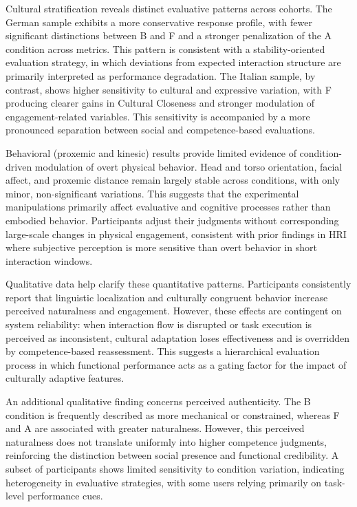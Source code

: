 Cultural stratification reveals distinct evaluative patterns across cohorts. The German sample exhibits a more conservative response profile, with fewer significant distinctions between B and F and a stronger penalization of the A condition across metrics. This pattern is consistent with a stability-oriented evaluation strategy, in which deviations from expected interaction structure are primarily interpreted as performance degradation. The Italian sample, by contrast, shows higher sensitivity to cultural and expressive variation, with F producing clearer gains in Cultural Closeness and stronger modulation of engagement-related variables. This sensitivity is accompanied by a more pronounced separation between social and competence-based evaluations.

Behavioral (proxemic and kinesic) results provide limited evidence of condition-driven modulation of overt physical behavior. Head and torso orientation, facial affect, and proxemic distance remain largely stable across conditions, with only minor, non-significant variations. This suggests that the experimental manipulations primarily affect evaluative and cognitive processes rather than embodied behavior. Participants adjust their judgments without corresponding large-scale changes in physical engagement, consistent with prior findings in HRI where subjective perception is more sensitive than overt behavior in short interaction windows.

Qualitative data help clarify these quantitative patterns. Participants consistently report that linguistic localization and culturally congruent behavior increase perceived naturalness and engagement. However, these effects are contingent on system reliability: when interaction flow is disrupted or task execution is perceived as inconsistent, cultural adaptation loses effectiveness and is overridden by competence-based reassessment. This suggests a hierarchical evaluation process in which functional performance acts as a gating factor for the impact of culturally adaptive features.

An additional qualitative finding concerns perceived authenticity. The B condition is frequently described as more mechanical or constrained, whereas F and A are associated with greater naturalness. However, this perceived naturalness does not translate uniformly into higher competence judgments, reinforcing the distinction between social presence and functional credibility. A subset of participants shows limited sensitivity to condition variation, indicating heterogeneity in evaluative strategies, with some users relying primarily on task-level performance cues.

